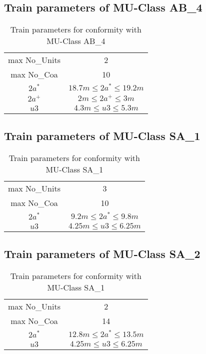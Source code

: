 \begin{appendices}
\subsection{Train parameters of MU-Class AB\_4}

\begin{table}[h]
    \centering
    \begin{tabular}{c|c}
    \hline
    max No\_Units & 2 \\
    max No\_Coa & 10 \\
    $2a^*$ & $ 18.7 m \leq 2a^* \leq 19.2 m $ \\
    $2a^+$ & $ 2 m \leq 2a^+ \leq 3m $ \\
    $u3$ & $4.3m \leq u3 \leq 5.3m $ \\
    \hline
    \end{tabular}
    \caption{Train parameters for conformity with MU-Class AB\_4}
    \label{tab:AB4}
\end{table}

\subsection{Train parameters of MU-Class SA\_1}

\begin{table}[h]
    \centering
    \begin{tabular}{c|c}
    \hline
    max No\_Units & 3 \\
    max No\_Coa & 10 \\
    $2a^*$ & $ 9.2 m \leq 2a^* \leq 9.8 m $ \\
    $u3$ & $4.25m \leq u3 \leq 6.25m $ \\
    \hline
    \end{tabular}
    \caption{Train parameters for conformity with MU-Class SA\_1}
    \label{tab:SA1}
\end{table}

\subsection{Train parameters of MU-Class SA\_2}

\begin{table}[h]
    \centering
    \begin{tabular}{c|c}
    \hline
    max No\_Units & 2 \\
    max No\_Coa & 14 \\
    $2a^*$ & $ 12.8 m \leq 2a^* \leq 13.5 m $ \\
    $u3$ & $4.25m \leq u3 \leq 6.25m $ \\
    \hline
    \end{tabular}
    \caption{Train parameters for conformity with MU-Class SA\_1}
    \label{tab:SA1}
\end{table}

\end{appendices}